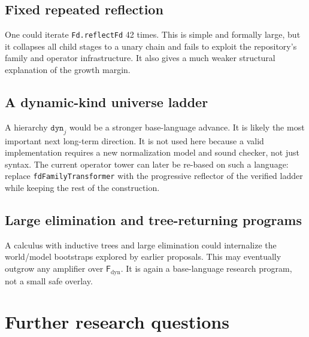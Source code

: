 \documentclass[11pt]{article}
\theoremstyle{definition}
\newcommand{\Fd}{\ensuremath{\mathsf{F}_{\mathrm{dyn}}}}
\newcommand{\lean}[1]{\texttt{#1}}
\begin{document}
\subsection{Fixed repeated reflection}
One could iterate \lean{Fd.reflectFd} 42 times.  This is simple and formally
large, but it collapses all child stages to a unary chain and fails to exploit
the repository's family and operator infrastructure.  It also gives a much
weaker structural explanation of the growth margin.

\subsection{A dynamic-kind universe ladder}
A hierarchy $\mathtt{dyn}_j$ would be a stronger base-language advance.  It is
likely the most important next long-term direction.  It is not used here
because a valid implementation requires a new normalization model and sound
checker, not just syntax.  The current operator tower can later be re-based on
such a language: replace \lean{fdFamilyTransformer} with the progressive
reflector of the verified ladder while keeping the rest of the construction.

\subsection{Large elimination and tree-returning programs}
A calculus with inductive trees and large elimination could internalize the
world/model bootstraps explored by earlier proposals.  This may eventually
outgrow any amplifier over \Fd.  It is again a base-language research program,
not a small safe overlay.

\section{Further research questions}
\end{document}

